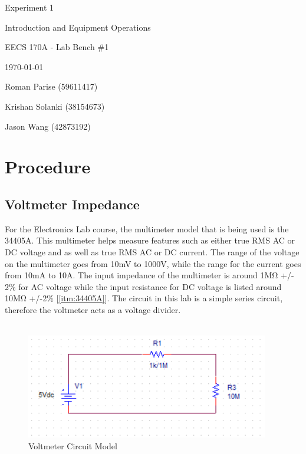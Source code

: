 \documentclass[a4paper,titlepage,10pt]{article}
\begin{document}
\begin{titlepage}
	\centering
	\vspace{2.5cm}
	{\huge Experiment 1 \par}
	{\LARGE Introduction and Equipment Operations \par}
	\vspace{1cm}
	{\Large EECS 170A - Lab Bench \#1 \par}
	{\Large \today \par}
	\vspace{1cm}
	{\large Roman Parise (59611417) \par}
	{\large Krishan Solanki (38154673) \par}
	{\large Jason Wang (42873192) \par}
	\vspace{1cm}
\end{titlepage}

\clearpage

\section{Procedure}
\subsection{Voltmeter Impedance}
%
For the Electronics Lab course, the multimeter model that is being used is the 34405A. This multimeter helps measure features such as either true RMS AC or DC voltage and as well as true RMS AC or DC current. The range of the voltage on the multimeter goes from 10mV to 1000V, while the range for the current goes from 10mA to 10A. The input impedance of the multimeter is around 1M\si{\ohm} +/- 2\% for AC voltage while the input resistance for DC voltage is listed around 10M\si{\ohm} +/-2\% [\ref{itm:34405A}]. The circuit in this lab is a simple series circuit, therefore the voltmeter acts as a voltage divider.\\
\\

\begin{figure}[h!]
\centering
\includegraphics{voltmeterfinal.PNG}
\caption{Voltmeter Circuit Model}
\label{fig:Voltmeter_Pic}
\end{figure}
\end{document}
